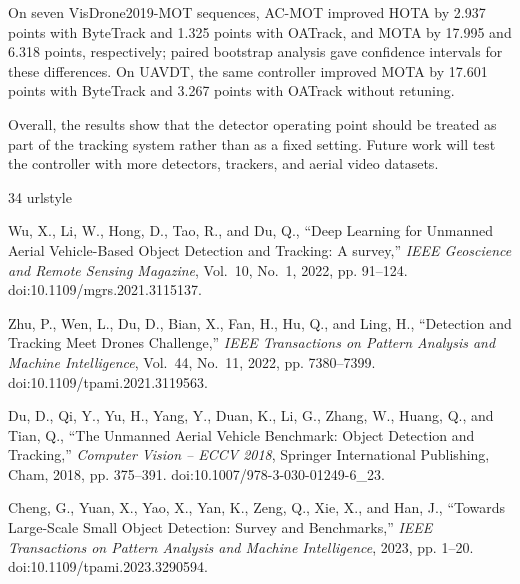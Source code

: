 \documentclass[journal]{new-aiaa}
\begin{document}
On seven VisDrone2019-MOT sequences, AC-MOT improved HOTA by 2.937 points with
ByteTrack and 1.325 points with OATrack, and MOTA by 17.995 and 6.318 points,
respectively; paired bootstrap analysis gave confidence intervals for these
differences. On UAVDT, the same controller improved MOTA by 17.601 points with
ByteTrack and 3.267 points with OATrack without retuning.

Overall, the results show that the detector operating point should be treated
as part of the tracking system rather than as a fixed setting. Future work
will test the controller with more detectors, trackers, and aerial video
datasets.

\begin{thebibliography}{34}
\newcommand{\enquote}[1]{``#1''}
\providecommand{\natexlab}[1]{#1}
\providecommand{\url}[1]{\texttt{#1}}
\providecommand{\urlprefix}{URL }
\expandafter\ifx\csname urlstyle\endcsname\relax
  \providecommand{\doi}[1]{doi:\discretionary{}{}{}#1}\else
  \providecommand{\doi}{doi:\discretionary{}{}{}\begingroup
  \urlstyle{rm}\Url}\fi

Wu, X., Li, W., Hong, D., Tao, R., and Du, Q., \enquote{{Deep Learning for
  Unmanned Aerial Vehicle-Based Object Detection and Tracking: A survey},}
  \emph{IEEE Geoscience and Remote Sensing Magazine}, Vol.~10, No.~1, 2022, pp.
  91--124.
\newblock \doi{10.1109/mgrs.2021.3115137}.

Zhu, P., Wen, L., Du, D., Bian, X., Fan, H., Hu, Q., and Ling, H.,
  \enquote{{Detection and Tracking Meet Drones Challenge},} \emph{IEEE
  Transactions on Pattern Analysis and Machine Intelligence}, Vol.~44, No.~11,
  2022, pp. 7380--7399.
\newblock \doi{10.1109/tpami.2021.3119563}.

Du, D., Qi, Y., Yu, H., Yang, Y., Duan, K., Li, G., Zhang, W., Huang, Q., and
  Tian, Q., \enquote{{The Unmanned Aerial Vehicle Benchmark: Object Detection
  and Tracking},} \emph{Computer Vision -- ECCV 2018}, Springer International
  Publishing, Cham, 2018, pp. 375--391.
\newblock \doi{10.1007/978-3-030-01249-6_23}.

Cheng, G., Yuan, X., Yao, X., Yan, K., Zeng, Q., Xie, X., and Han, J.,
  \enquote{{Towards Large-Scale Small Object Detection: Survey and
  Benchmarks},} \emph{IEEE Transactions on Pattern Analysis and Machine
  Intelligence}, 2023, pp. 1--20.
\newblock \doi{10.1109/tpami.2023.3290594}.


\end{thebibliography}
\end{document}
